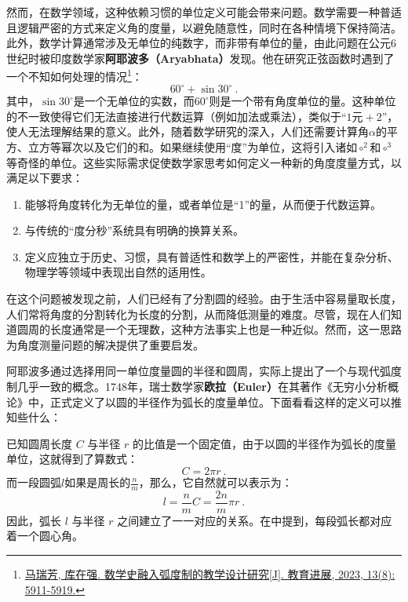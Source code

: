 然而，在数学领域，这种依赖习惯的单位定义可能会带来问题。数学需要一种普适且逻辑严密的方式来定义角的度量，以避免随意性，同时在各种情境下保持简洁。此外，数学计算通常涉及无单位的纯数字，而非带有单位的量，由此问题在公元6世纪时被印度数学家\textbf{阿耶波多（Aryabhata）}发现。他在研究正弦函数时遇到了一个不知如何处理的情况\footnote{\href{https://www.hanspub.org/journal/PaperInformation?paperID=71063&utm_source=chatgpt.com}{马瑞芳, 库在强. 数学史融入弧度制的教学设计研究[J]. 教育进展, 2023, 13(8): 5911-5919.}}：
\begin{equation}
60^\circ+\sin30^\circ~.
\end{equation}
其中，$\sin 30^\circ$是一个无单位的实数，而$60^\circ$则是一个带有角度单位的量。这种单位的不一致使得它们无法直接进行代数运算（例如加法或乘法），类似于“$1\text{元} + 2$”，使人无法理解结果的意义。此外，随着数学研究的深入，人们还需要计算角$\alpha$的平方、立方等幂次以及它们的和。如果继续使用“度”为单位，这将引入诸如$\circ^2$和$\circ^3$等奇怪的单位。这些实际需求促使数学家思考如何定义一种新的角度度量方式，以满足以下要求：
\begin{enumerate}
\item 能够将角度转化为无单位的量，或者单位是“1”的量，从而便于代数运算。
\item 与传统的“度分秒”系统具有明确的换算关系。
\item 定义应独立于历史、习惯，具有普适性和数学上的严密性，并能在复杂分析、物理学等领域中表现出自然的适用性。
\end{enumerate}

在这个问题被发现之前，人们已经有了分割圆的经验。由于生活中容易量取长度，人们常将角度的分割转化为长度的分割，从而降低测量的难度。尽管，现在人们知道圆周的长度通常是一个无理数，这种方法事实上也是一种近似。然而，这一思路为角度测量问题的解决提供了重要启发。

阿耶波多通过选择用同一单位度量圆的半径和圆周，实际上提出了一个与现代弧度制几乎一致的概念。1748年，瑞士数学家\textbf{欧拉（Euler）}在其著作《无穷小分析概论》中，正式定义了以圆的半径作为弧长的度量单位。下面看看这样的定义可以推知些什么：

已知圆周长度 $C$ 与半径 $r$ 的比值是一个固定值，由于以圆的半径作为弧长的度量单位，这就得到了算数式：
\begin{equation}
C=2\pi r~.
\end{equation}
而一段圆弧$l$如果是周长的$\displaystyle\frac{n}{m}$，那么，它自然就可以表示为：
\begin{equation}
l=\frac{n}{m}C=\frac{2n}{m}\pi r~.
\end{equation}
因此，弧长 $l$ 与半径 $r$ 之间建立了一一对应的关系。在中提到，每段弧长都对应着一个圆心角。


